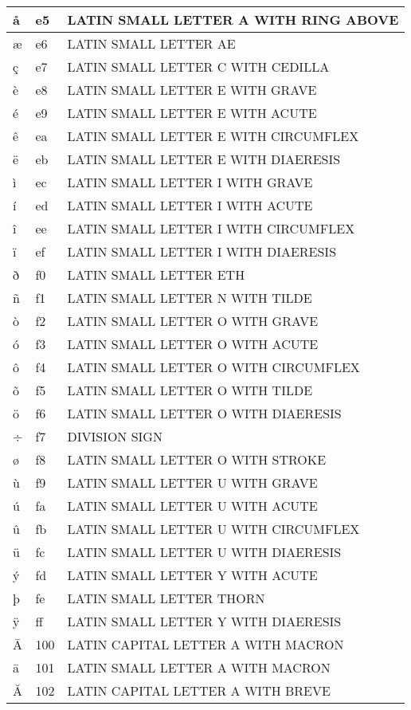 \documentclass[12pt,letterpaper,openany]{book}
\begin{document}
\begin{center}
\begin{supertabular}{|m{0.25in}|m{0.5in}|m{4in}|}
å & e5 & LATIN SMALL LETTER A WITH RING ABOVE\\\hline
æ & e6 & LATIN SMALL LETTER AE\\\hline
ç & e7 & LATIN SMALL LETTER C WITH CEDILLA\\\hline
è & e8 & LATIN SMALL LETTER E WITH GRAVE\\\hline
é & e9 & LATIN SMALL LETTER E WITH ACUTE\\\hline
ê & ea & LATIN SMALL LETTER E WITH CIRCUMFLEX\\\hline
ë & eb & LATIN SMALL LETTER E WITH DIAERESIS\\\hline
ì & ec & LATIN SMALL LETTER I WITH GRAVE\\\hline
í & ed & LATIN SMALL LETTER I WITH ACUTE\\\hline
î & ee & LATIN SMALL LETTER I WITH CIRCUMFLEX\\\hline
ï & ef & LATIN SMALL LETTER I WITH DIAERESIS\\\hline
ð & f0 & LATIN SMALL LETTER ETH\\\hline
ñ & f1 & LATIN SMALL LETTER N WITH TILDE\\\hline
ò & f2 & LATIN SMALL LETTER O WITH GRAVE\\\hline
ó & f3 & LATIN SMALL LETTER O WITH ACUTE\\\hline
ô & f4 & LATIN SMALL LETTER O WITH CIRCUMFLEX\\\hline
õ & f5 & LATIN SMALL LETTER O WITH TILDE\\\hline
ö & f6 & LATIN SMALL LETTER O WITH DIAERESIS\\\hline
÷ & f7 & DIVISION SIGN\\\hline
ø & f8 & LATIN SMALL LETTER O WITH STROKE\\\hline
ù & f9 & LATIN SMALL LETTER U WITH GRAVE\\\hline
ú & fa & LATIN SMALL LETTER U WITH ACUTE\\\hline
û & fb & LATIN SMALL LETTER U WITH CIRCUMFLEX\\\hline
ü & fc & LATIN SMALL LETTER U WITH DIAERESIS\\\hline
ý & fd & LATIN SMALL LETTER Y WITH ACUTE\\\hline
þ & fe & LATIN SMALL LETTER THORN\\\hline
ÿ & ff & LATIN SMALL LETTER Y WITH DIAERESIS\\\hline
Ā & 100 & LATIN CAPITAL LETTER A WITH MACRON\\\hline
ā & 101 & LATIN SMALL LETTER A WITH MACRON\\\hline
Ă & 102 & LATIN CAPITAL LETTER A WITH BREVE\\\hline

\end{supertabular}
\end{center}
\end{document}
